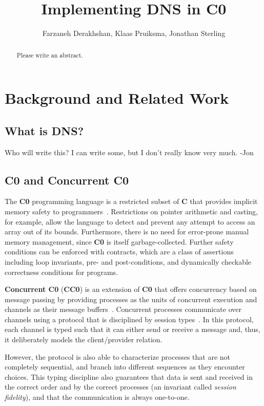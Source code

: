 \documentclass{article}
\title{Implementing DNS in C0}
\author{Farzaneh Derakhshan, Klaas Pruiksma, Jonathan Sterling}
\newcommand\Kwd[1]{{\sffamily\bfseries{#1}}}
\begin{document}
\maketitle

\begin{abstract}
  Please write an abstract.
\end{abstract}

\section{Background and Related Work}

\subsection{What is DNS?}

Who will write this? I can write some, but I don't really know very much. -Jon

\subsection{C0 and Concurrent C0}\label{sec:c0}

The \Kwd{C0} programming language is a restricted subset of \Kwd{C}
that provides implicit memory safety to
programmers~\cite{pfenning:c0-reference}. Restrictions on pointer
arithmetic and casting, for example, allow the language to detect and
prevent any attempt to access an array out of its bounds. Furthermore,
there is no need for error-prone manual memory management, since
\Kwd{C0} is itself garbage-collected. Further safety conditions can be
enforced with contracts, which are a class of assertions including
loop invariants, pre- and post-conditions, and dynamically checkable
correctness conditions for programs.

\Kwd{Concurrent C0} (\Kwd{CC0}) is an extension of \Kwd{C0} that
offers concurrency based on message passing by providing processes as
the units of concurrent execution and channels as their message
buffers~\cite{willsey-prabhu-pfenning:2016}. Concurrent processes
communicate over channels using a protocol that is disciplined by
session types~\cite{caires-pfenning-toninho:2013,
  balzer-pfenning:2017}. In this protocol, each channel is typed such
that it can either send or receive a message and, thus, it
deliberately models the client/provider relation.

However, the protocol is also able to characterize processes that are
not completely sequential, and branch into different sequences as they
encounter choices. This typing discipline also guarantees that data is
sent and received in the correct order and by the correct processes
(an invariant called \emph{session fidelity}), and that the
communication is always one-to-one.
\end{document}
